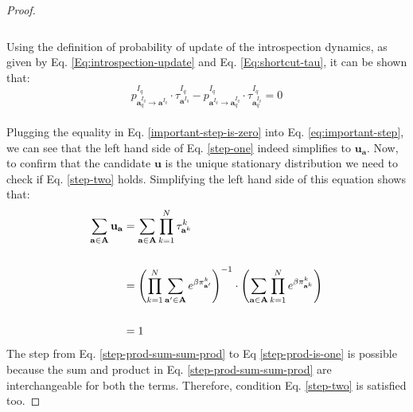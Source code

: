 \documentclass[11pt]{article}
\theoremstyle{plainCl1}
\theoremstyle{plainCl2}
\newcommand{\A}{\mathbf{A}}
\newcommand{\abf}{\mathbf{a}}
\newcommand{\ubf}{\mathbf{u}}
\begin{document}
\begin{proof}
\begin{align}
\end{align}
\\ Using the definition of probability of update of the introspection dynamics, as given by Eq. \ref{Eq:introspection-update} and Eq. \ref{Eq:shortcut-tau}, it can be shown that: 
\begin{equation}
p^{I_q}_{\abf^{I_q}_q \to \abf^{I_q}} \cdot \tau^{I_q}_{\abf^{I_q}} -  p^{I_q}_{\abf^{I_q} \to \abf^{I_q}_q} \cdot \tau^{I_q}_{\abf^{I_q}_q} = 0
\label{important-step-is-zero}
\end{equation}
\\ \noindent Plugging the equality in Eq. \ref{important-step-is-zero} into Eq. \ref{eq:important-step}, we can see that the left hand side of Eq. \ref{step-one} indeed simplifies to $\ubf_{\abf}$. Now, to confirm that the candidate $\ubf$ is the unique stationary distribution we need to check if Eq. \ref{step-two} holds. Simplifying the left hand side of this equation shows that:
\begin{align}
\sum_{\abf \in \A} \ubf_\abf &= \sum_{\abf \in \A} \prod_{k=1}^N \tau^k_{\abf^k} \\ \notag \\
\label{step-prod-sum-sum-prod}
&= \left( \prod_{k=1}^N \sum_{\abf' \in \A} \displaystyle e^{\beta \pi^k_{\abf'}}\right)^{-1} \cdot \left( \sum_{\abf \in \A} \prod_{k=1}^N \displaystyle e^{\beta \pi^k_{\abf^k}} \right) \\ \notag \\
\label{step-prod-is-one}
&= 1
\end{align}
\noindent The step from Eq. \ref{step-prod-sum-sum-prod} to Eq \ref{step-prod-is-one} is possible because the sum and product in Eq. \ref{step-prod-sum-sum-prod} are interchangeable for both the terms. Therefore, condition Eq. \ref{step-two} is satisfied too. 
\end{proof}
\end{document}
